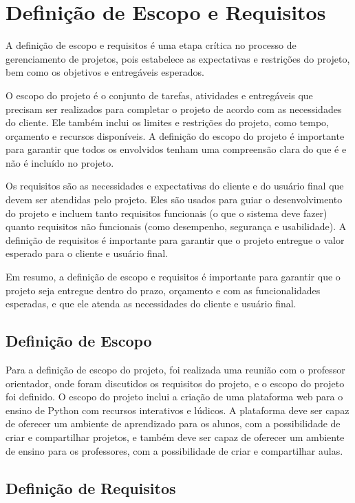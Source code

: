 \section{Definição de Escopo e Requisitos}

A definição de escopo e requisitos é uma etapa crítica no processo de gerenciamento de projetos, pois estabelece as expectativas e restrições do projeto, bem como os objetivos e entregáveis esperados.

O escopo do projeto é o conjunto de tarefas, atividades e entregáveis que precisam ser realizados para completar o projeto de acordo com as necessidades do cliente. Ele também inclui os limites e restrições do projeto, como tempo, orçamento e recursos disponíveis. A definição do escopo do projeto é importante para garantir que todos os envolvidos tenham uma compreensão clara do que é e não é incluído no projeto. \cite{Xavier2009}

Os requisitos são as necessidades e expectativas do cliente e do usuário final que devem ser atendidas pelo projeto. Eles são usados para guiar o desenvolvimento do projeto e incluem tanto requisitos funcionais (o que o sistema deve fazer) quanto requisitos não funcionais (como desempenho, segurança e usabilidade). A definição de requisitos é importante para garantir que o projeto entregue o valor esperado para o cliente e usuário final. \cite{Machado2018}

Em resumo, a definição de escopo e requisitos é importante para garantir que o projeto seja entregue dentro do prazo, orçamento e com as funcionalidades esperadas, e que ele atenda as necessidades do cliente e usuário final.

\subsection{Definição de Escopo}

Para a definição de escopo do projeto, foi realizada uma reunião com o professor orientador, onde foram discutidos os requisitos do projeto, e o escopo do projeto foi definido. O escopo do projeto inclui a criação de uma plataforma web para o ensino de Python com recursos interativos e lúdicos. A plataforma deve ser capaz de oferecer um ambiente de aprendizado para os alunos, com a possibilidade de criar e compartilhar projetos, e também deve ser capaz de oferecer um ambiente de ensino para os professores, com a possibilidade de criar e compartilhar aulas.

\subsection{Definição de Requisitos}

